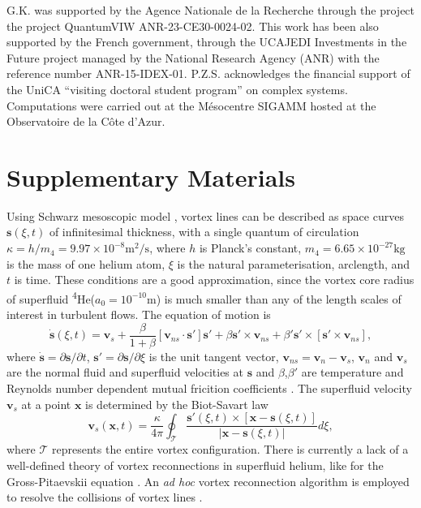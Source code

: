 \documentclass[%
 reprint,
 amsmath,amssymb,
 aps,
 prl,
]{revtex4-2}
\def \s{\mathbf{s}}
\def \v{\mathbf{v}}
\def \x{\mathbf{x}}
\begin{document}
{\begin{acknowledgments}
    G.K. was supported by the Agence Nationale de la Recherche through the project the project QuantumVIW ANR-23-CE30-0024-02.
    This work has been also supported by the French government, through the UCAJEDI Investments in the Future project managed by the National Research Agency (ANR) with the reference number ANR-15-IDEX-01. P.Z.S. acknowledges the financial support of the UniCA ``visiting doctoral student program'' on complex systems. Computations were carried out at the Mésocentre SIGAMM hosted at the Observatoire de la Côte d’Azur.

  \end{acknowledgments}



\appendix
\section*{Supplementary Materials}

Using Schwarz mesoscopic model \cite{schwarz1988}, vortex lines can be described as space curves $\s(\xi,t)$ of infinitesimal thickness, with a single quantum of circulation $\kappa=h/m_4=9.97\times10^{-8}\text{m}^2/\text{s}$, where $h$ is Planck's constant, $m_4=6.65\times10^{-27}\text{kg}$ is the mass of one helium atom, $\xi$ is the natural parameterisation, arclength, and $t$ is time. These conditions are a good approximation, since the vortex core radius of superfluid \textsuperscript{4}He($a_0=10^{-10}\text{m}$) is much smaller than any of the length scales of interest in turbulent flows. The equation of motion is
\begin{equation}
	\dot{\s}(\xi,t) = \v_s + \frac{\beta}{1+\beta}\left[\v_{ns}\cdot \s'\right]\s' + \beta\s'\times\v_{ns}+\beta'\s'\times\left[\s'\times \v_{ns}\right],
\end{equation}
where $\dot{\s}=\partial\s/\partial t$, $\s'=\partial\s/\partial \xi$ is the unit tangent vector, $\v_{ns}=\v_n - \v_s$, $\v_n$ and $\v_s$ are the normal fluid and superfluid velocities at $\s$ and $\beta$,$\beta'$ are temperature and Reynolds number dependent mutual fricition coefficients \cite{galantucciNewSelfconsistentApproach2020b}. The superfluid velocity $\v_s$ at a point $\x$ is determined by the Biot-Savart law
\begin{equation}
	\v_s(\x,t) = \frac{\kappa}{4\pi}\oint_{\mathcal{T}}\frac{\s'(\xi,t)\times\left[\x-\s(\xi,t)\right]}{|\x-\s(\xi,t)|}d\xi,
\end{equation}
where $\mathcal{T}$ represents the entire vortex configuration.
There is currently a lack of a well-defined theory of vortex reconnections in superfluid helium, like for the Gross-Pitaevskii equation \cite{villois2020irreversible,villoisUniversalNonuniversalAspects2017,promentMatchingTheoryCharacterize2020a}. An \emph{ad hoc} vortex reconnection algorithm is employed to resolve the collisions of vortex lines \cite{baggaleySensitivityVortexFilament2012a}.

}
\end{document}
